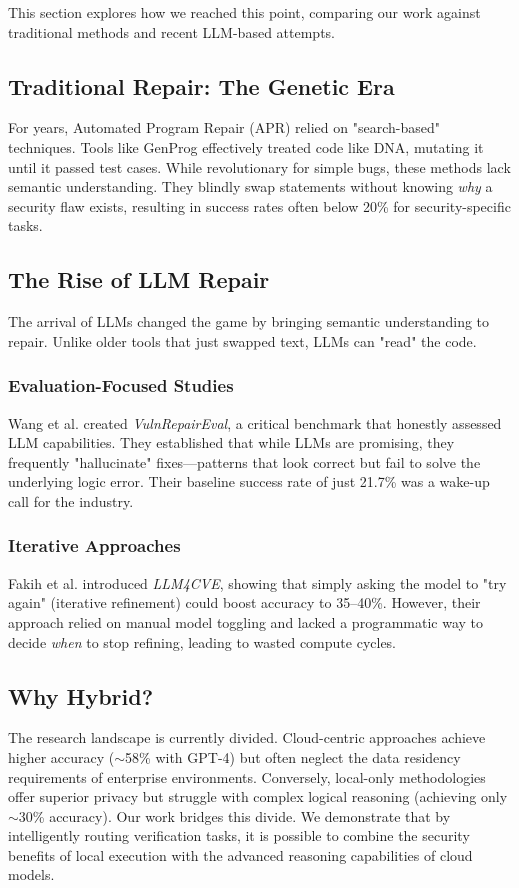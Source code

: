 \documentclass[conference]{IEEEtran}
\begin{document}
This section explores how we reached this point, comparing our work against traditional methods and recent LLM-based attempts.

\subsection{Traditional Repair: The Genetic Era}
For years, Automated Program Repair (APR) relied on "search-based" techniques. Tools like GenProg \cite{legoues2012genprog} effectively treated code like DNA, mutating it until it passed test cases. While revolutionary for simple bugs, these methods lack semantic understanding. They blindly swap statements without knowing \textit{why} a security flaw exists, resulting in success rates often below 20\% for security-specific tasks.

\subsection{The Rise of LLM Repair}
The arrival of LLMs changed the game by bringing semantic understanding to repair. Unlike older tools that just swapped text, LLMs can "read" the code.
\subsubsection{Evaluation-Focused Studies}
Wang et al. \cite{wang2024vulnrepair} created \textit{VulnRepairEval}, a critical benchmark that honestly assessed LLM capabilities. They established that while LLMs are promising, they frequently "hallucinate" fixes—patterns that look correct but fail to solve the underlying logic error. Their baseline success rate of just 21.7\% was a wake-up call for the industry.
\subsubsection{Iterative Approaches}
Fakih et al. \cite{fakih2024llm4cve} introduced \textit{LLM4CVE}, showing that simply asking the model to "try again" (iterative refinement) could boost accuracy to 35--40\%. However, their approach relied on manual model toggling and lacked a programmatic way to decide \textit{when} to stop refining, leading to wasted compute cycles.

\subsection{Why Hybrid?}
The research landscape is currently divided. Cloud-centric approaches \cite{xia2023keep} achieve higher accuracy ($\sim$58\% with GPT-4) but often neglect the data residency requirements of enterprise environments. Conversely, local-only methodologies \cite{gajjar2024securefix} offer superior privacy but struggle with complex logical reasoning (achieving only $\sim$30\% accuracy). Our work bridges this divide. We demonstrate that by intelligently routing verification tasks, it is possible to combine the security benefits of local execution with the advanced reasoning capabilities of cloud models.
\end{document}
